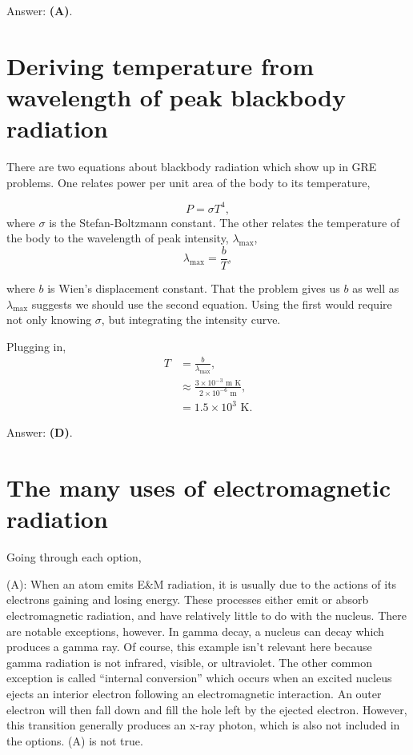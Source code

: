 \documentclass[11pt]{paper}
\newcommand{\answer}[1]{Answer: \textbf{(#1)}.}
\begin{document}
\answer{A}

\section{Deriving temperature from wavelength of peak blackbody radiation}

There are two equations about blackbody radiation which show up in GRE problems.  One relates power per unit area of the body to its temperature,

\begin{equation}
P = \sigma T^4,
\end{equation}
where $\sigma$ is the Stefan-Boltzmann constant.  The other relates the temperature of the body to the wavelength of peak intensity, $\lambda_\text{max}$,
\begin{equation}
\lambda_\text{max} = \frac{b}{T},
\end{equation}

where $b$ is Wien's displacement constant.  That the problem gives us $b$ as well as $\lambda_\text{max}$ suggests we should use the second equation.  Using the first would require not only knowing $\sigma$, but integrating the intensity curve.

Plugging in,
\begin{align}
T &= \frac{b}{\lambda_\text{max}},\\
&\approx \frac{3\times 10^{-3}\text{ m K}}{2\times 10^{-6}\text{ m}},\\
&= 1.5\times 10^3 \text{ K}.
\end{align}

\answer{D}

\section{The many uses of electromagnetic radiation}

Going through each option,

(A):  When an atom emits E\&M radiation, it is usually due to the actions of its electrons gaining and losing energy.  These processes either emit or absorb electromagnetic radiation, and have relatively little to do with the nucleus.  There are notable exceptions, however.  In gamma decay, a nucleus can decay which produces a gamma ray.  Of course, this example isn't relevant here because gamma radiation is not infrared, visible, or ultraviolet.  The other common exception is called ``internal conversion'' which occurs when an excited nucleus ejects an interior electron following an electromagnetic interaction.  An outer electron will then fall down and fill the hole left by the ejected electron.  However, this transition generally produces an x-ray photon, which is also not included in the options.  (A) is not true.
\end{document}
